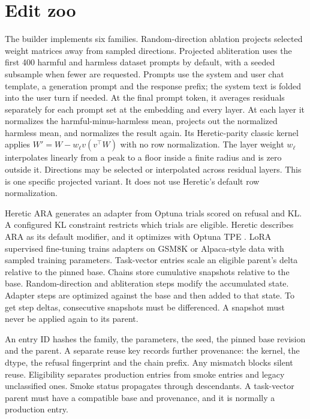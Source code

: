 \section{Edit zoo}
\label{sec:zoo}
The builder implements six families. Random-direction ablation projects selected weight matrices away from sampled directions. Projected abliteration uses the first 400 harmful and harmless dataset prompts by default, with a seeded subsample when fewer are requested. Prompts use the system and user chat template, a generation prompt and the response prefix; the system text is folded into the user turn if needed. At the final prompt token, it averages residuals separately for each prompt set at the embedding and every layer. At each layer it normalizes the harmful-minus-harmless mean, projects out the normalized harmless mean, and normalizes the result again. Its Heretic-parity classic kernel applies $W'=W-w_\ell v(v^\top W)$ with no row normalization. The layer weight $w_\ell$ interpolates linearly from a peak to a floor inside a finite radius and is zero outside it. Directions may be selected or interpolated across residual layers. This is one specific projected variant. It does not use Heretic's default row normalization.

Heretic ARA generates an adapter from Optuna trials scored on refusal and KL. A configured KL constraint restricts which trials are eligible. Heretic describes ARA as its default modifier, and it optimizes with Optuna TPE \citep{heretic2026}. LoRA supervised fine-tuning trains adapters on GSM8K or Alpaca-style data with sampled training parameters. Task-vector entries scale an eligible parent's delta relative to the pinned base. Chains store cumulative snapshots relative to the base. Random-direction and abliteration steps modify the accumulated state. Adapter steps are optimized against the base and then added to that state. To get step deltas, consecutive snapshots must be differenced. A snapshot must never be applied again to its parent.

An entry ID hashes the family, the parameters, the seed, the pinned base revision and the parent. A separate reuse key records further provenance: the kernel, the dtype, the refusal fingerprint and the chain prefix. Any mismatch blocks silent reuse. Eligibility separates production entries from smoke entries and legacy unclassified ones. Smoke status propagates through descendants. A task-vector parent must have a compatible base and provenance, and it is normally a production entry.

